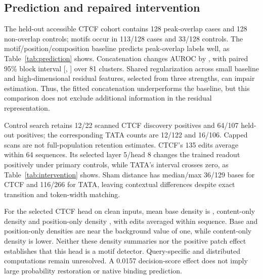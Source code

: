 \documentclass[unnumsec,webpdf,modern,large,namedate]{oup-authoring-template}
\begin{document}
\subsection{Prediction and repaired intervention}
The held-out accessible CTCF cohort contains 128 peak-overlap cases and 128 non-overlap controls; motifs occur in 113/128 cases and 33/128 controls. The motif/position/composition baseline predicts peak-overlap labels well, as Table~\ref{tab:prediction} shows. Concatenation changes AUROC by \IncrementalMean{}, with paired 95\% block interval [\IncrementalLow{}, \IncrementalHigh{}] over 81 clusters. Shared regularization across small baseline and high-dimensional residual features, selected from three strengths, can impair estimation. Thus, the fitted concatenation underperforms the baseline, but this comparison does not exclude additional information in the residual representation.
\begin{table}[t]\centering\setlength{\tabcolsep}{4pt}
\caption{Accessible CTCF prediction on fixed held-out membership. Marginal sequence-bootstrap intervals condition on fitted classifiers; the paired difference uses blocks.}
\label{tab:prediction}\end{table}

Control search retains 12/22 scanned CTCF discovery positives and 64/107 held-out positives; the corresponding TATA counts are 12/122 and 16/106. Capped scans are not full-population retention estimates. CTCF's 135 edits average within 64 sequences. Its selected layer 5/head 8 changes the trained readout positively under primary controls, while TATA's interval crosses zero, as Table~\ref{tab:intervention} shows. Sham distance has median/max 36/129 bases for CTCF and 116/266 for TATA, leaving contextual differences despite exact transition and token-width matching.
\begin{table}[t]\centering\setlength{\tabcolsep}{3pt}
\caption{Fixed-head trained-readout intervention on held-out chromosomes. Effects are sequence-weighted motif-minus-sham decision-score changes; 95\% intervals and primary p-values use blocks. Indices are zero-based.}
\label{tab:intervention}\end{table}

For the selected CTCF head on clean inputs, mean base density is \SelectedBase{}, content-only density \SelectedContent{} and position-only density \SelectedPosition{}, with edits averaged within sequence. Base and position-only densities are near the background value of one, while content-only density is lower. Neither these density summaries nor the positive patch effect establishes that this head is a motif detector. Query-specific and distributed computations remain unresolved. A 0.0157 decision-score effect does not imply large probability restoration or native binding prediction.
\end{document}
